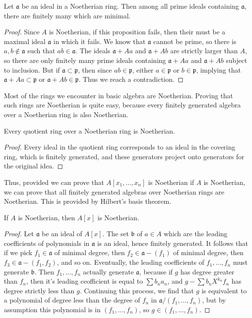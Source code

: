 \begin{theorem}
    Let $\mathfrak{a}$ be an ideal in a Noetherian ring. Then among all prime ideals containing $\mathfrak{a}$, there are finitely many which are minimal.
\end{theorem}
\begin{proof}
    Since $A$ is Noetherian, if this proposition fails, then their must be a maximal ideal $\mathfrak{a}$ in which it fails. We know that $\mathfrak{a}$ cannot be prime, so there is $a,b \not \in \mathfrak{a}$ such that $ab \in \mathfrak{a}$. The ideals $\mathfrak{a} + Aa$ and $\mathfrak{a} + Ab$ are strictly larger than $A$, so there are only finitely many prime ideals containing $\mathfrak{a} + Aa$ and $\mathfrak{a} + Ab$ subject to inclusion. But if $\mathfrak{a} \subset \mathfrak{p}$, then since $ab \in \mathfrak{p}$, either $a \in \mathfrak{p}$ or $b \in \mathfrak{p}$, implying that $\mathfrak{a} + Aa \subset \mathfrak{p}$ or $\mathfrak{a} + Ab \in \mathfrak{p}$. Thus we reach a contradiction.
\end{proof}

Most of the rings we encounter in basic algebra are Noetherian. Proving that such rings are Noetherian is quite easy, because every finitely generated algebra over a Noetherian ring is also Noetherian.

\begin{lemma}
    Every quotient ring over a Noetherian ring is Noetherian.
\end{lemma}
\begin{proof}
    Every ideal in the quotient ring corresponds to an ideal in the covering ring, which is finitely generated, and these generators project onto generators for the original idea.
\end{proof}

Thus, provided we can prove that $A[x_1, \dots, x_n]$ is Noetherian if $A$ is Noetherian, we can prove that all finitely generated algebras over Noetherian rings are Noetherian. This is provided by Hilbert's basis theorem.

\begin{theorem}
    If $A$ is Noetherian, then $A[x]$ is Noetherian.
\end{theorem}
\begin{proof}
    Let $\mathfrak{a}$ be an ideal of $A[x]$. The set $\mathfrak{b}$ of $a \in A$ which are the leading coefficients of polynomials in $\mathfrak{a}$ is an ideal, hence finitely generated. It follows that if we pick $f_1 \in \mathfrak{a}$ of minimal degree, then $f_2 \in \mathfrak{a} - (f_1)$ of minimal degree, then $f_3 \in \mathfrak{a} - (f_1, f_2)$, and so on. Eventually, the leading coefficients of $f_1, \dots, f_n$ must generate $\mathfrak{b}$. Then $f_1, \dots, f_n$ actually generate $\mathfrak{a}$, because if $g$ has degree greater than $f_n$, then it's leading ceofficient is equal to $\sum b_n a_n$, and $g - \sum b_n X^{k_n} f_n$ has degree strictly less than $g$. Continuing this process, we find that $g$ is equivalent to a polynomial of degree less than the degree of $f_n$ in $\mathfrak{a}/(f_1, \dots, f_n)$, but by assumption this polynomial is in $(f_1, \dots, f_n)$, so $g \in (f_1, \dots, f_n)$.
\end{proof}

